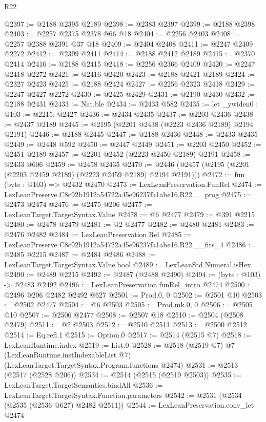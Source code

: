 \begin{lexlean}{R22}
\begin{coremodule}
@2397 := @2188 @2395 @2189
@2398 := @2383 @2397
@2399 := @2188 @2398
@2403 := @2257 @2375 @2378 @66 @18
@2404 := @2256 @2403
@2408 := @2257 @2388 @2391 @37 @18
@2409 := @2404 @2408
@2411 := @2247 @2409 @2272
@2412 := @2399 @2411
@2414 := @2188 @2412 @2189
@2415 := @2370 @2414
@2416 := @2188 @2415
@2418 := @2256 @2366 @2409
@2420 := @2247 @2418 @2272
@2421 := @2416 @2420
@2423 := @2188 @2421 @2189
@2424 := @2327 @2423
@2425 := @2188 @2424
@2427 := @2256 @2323 @2418
@2429 := @2247 @2427 @2272
@2430 := @2425 @2429
@2431 := @2190 @2430
@2432 := @2188 @2431
@2433 := Nat.ble
@2434 := @2433 @582
@2435 := let _ywiden0 : @103 := @2215; @2427
@2436 := @2434 @2435
@2437 := @2203 @2436
@2438 := @2437 @2189
@2445 := @2195 (@2201 @2438 (@2223 @2436 @2189) @2194 @2191)
@2446 := @2188 @2445
@2447 := @2188 @2436
@2448 := @2433 @2435
@2449 := @2448 @592
@2450 := @2447 @2449
@2451 := @2203 @2450
@2452 := @2451 @2189
@2457 := @2201 @2452 (@2223 @2450 @2189) @2191
@2458 := @2433 @606
@2459 := @2458 @2435
@2470 := @2446 (@2457 (@2195 (@2201 (@2203 @2459 @2189) (@2223 @2459 @2189) @2194 @2191)))
@2472 := fun (byte : @103) => @2432 @2470
@2473 := LexLeanPreservation.FunRel
@2474 := LexLeanPreserve.C8c92b1912a54722a45e96237fa1abe16.R22.__prog
@2475 := @2473 @2474
@2476 := @2475 @206
@2477 := LexLeanTarget.TargetSyntax.Value
@2478 := @6 @2477
@2479 := @391 @2215
@2480 := @2478 @2479
@2481 := @2 @2477
@2482 := @2480 @2481
@2483 := @2476 @2482
@2484 := LexLeanPreservation.Rel
@2485 := LexLeanPreserve.C8c92b1912a54722a45e96237fa1abe16.R22.__fits_4
@2486 := @2485 @2215
@2487 := @2484 @2486
@2488 := LexLeanTarget.TargetSyntax.Value.bool
@2489 := LexLeanStd.Numeral.isHex
@2490 := @2489 @2215
@2492 := @2487 (@2488 @2490)
@2494 := (byte : @103) -> @2483 @2492
@2496 := LexLeanPreservation.funRel_intro @2474
@2500 := @2496 @206 @2482 @2492 @627
@2501 := Prod.{0, 0}
@2502 := @2501 @10
@2503 := @2502 @2477
@2504 := @6 @2503
@2505 := Prod.mk.{0, 0}
@2506 := @2505 @10
@2507 := @2506 @2477
@2508 := @2507 @18
@2510 := @2504 (@2508 @2479)
@2511 := @2 @2503
@2512 := @2510 @2511
@2513 := @2500 @2512
@2514 := Eq.refl.{1}
@2515 := Option.{0}
@2517 := @2514 (@2515 @7)
@2518 := LexLeanRuntime.index
@2519 := List.{0}
@2528 := @2518
    (@2519 @7)
    @7
    (LexLeanRuntime.instIndexableList @7)
    (LexLeanTarget.TargetSyntax.Program.functions @2474)
@2531 := @2513 (@2517 (@2528 @206))
@2534 := @2514 (@2515 (@2519 @2503))
@2535 := LexLeanTarget.TargetSemantics.bindAll
@2536 := LexLeanTarget.TargetSyntax.Function.parameters
@2542 := @2531 (@2534 (@2535 (@2536 @627) @2482 @2511))
@2544 := LexLeanPreservation.conv_let @2474

\end{coremodule}
\end{lexlean}
